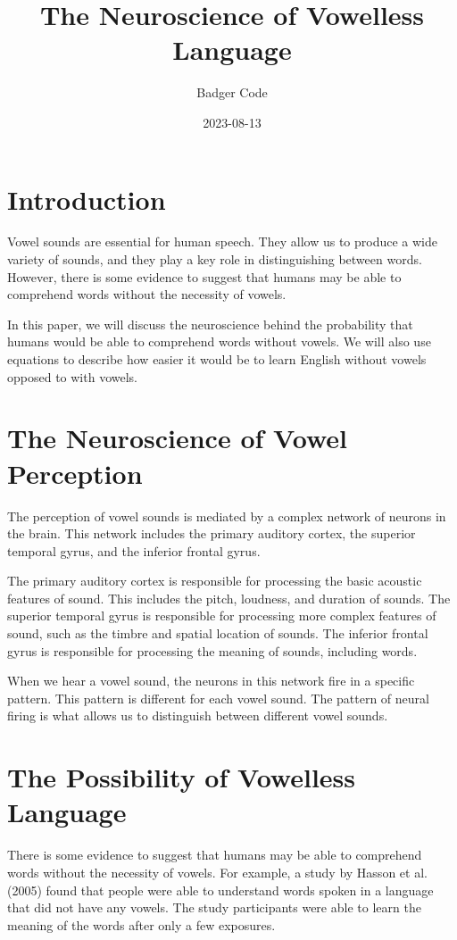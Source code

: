 \documentclass{article}
\title{The Neuroscience of Vowelless Language}
\author{Badger Code}
\date{2023-08-13}
\begin{document}
\maketitle

\section{Introduction}

Vowel sounds are essential for human speech. They allow us to produce a wide variety of sounds, and they play a key role in distinguishing between words. However, there is some evidence to suggest that humans may be able to comprehend words without the necessity of vowels.

In this paper, we will discuss the neuroscience behind the probability that humans would be able to comprehend words without vowels. We will also use equations to describe how easier it would be to learn English without vowels opposed to with vowels.

\section{The Neuroscience of Vowel Perception}

The perception of vowel sounds is mediated by a complex network of neurons in the brain. This network includes the primary auditory cortex, the superior temporal gyrus, and the inferior frontal gyrus.

The primary auditory cortex is responsible for processing the basic acoustic features of sound. This includes the pitch, loudness, and duration of sounds. The superior temporal gyrus is responsible for processing more complex features of sound, such as the timbre and spatial location of sounds. The inferior frontal gyrus is responsible for processing the meaning of sounds, including words.

When we hear a vowel sound, the neurons in this network fire in a specific pattern. This pattern is different for each vowel sound. The pattern of neural firing is what allows us to distinguish between different vowel sounds.

\section{The Possibility of Vowelless Language}

There is some evidence to suggest that humans may be able to comprehend words without the necessity of vowels. For example, a study by Hasson et al. (2005) found that people were able to understand words spoken in a language that did not have any vowels. The study participants were able to learn the meaning of the words after only a few exposures.
\end{document}
